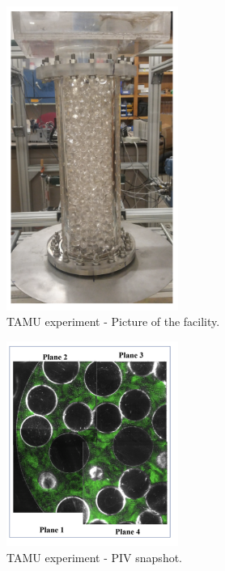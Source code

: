 \begin{figure}[htb!]
\centering
\includegraphics[width=0.5\textwidth]{Figures/pb_tamu1}
\caption{TAMU experiment - Picture of the facility.}
\label{f:tamu1}
\end{figure}

\begin{figure}[htb!]
\centering
\includegraphics[width=0.5\textwidth]{Figures/pb_tamu2}
\caption{TAMU experiment - PIV snapshot.}
\label{f:tamu2}
\end{figure}

